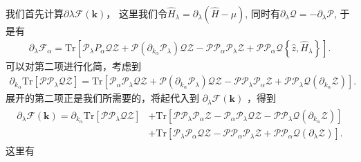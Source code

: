 \documentclass[10pt, oneside]{article}
\begin{document}
我们首先计算\(\partial \lambda \mathcal{F}  \left(\bm{k }\right)\)， 这里我们令\(\hat{H}_{\lambda} = \partial_{\lambda} \left(\hat{H} - \mu\right)\), 同时有\(\partial_{\lambda} \mathcal{Q} = - \partial_{\lambda} \mathcal{P}\), 于是有
\begin{align}
	\boxed{
		\partial_{\lambda} \mathcal{F}_{\alpha} = \mathrm{Tr} \left[\mathcal{P}_{\lambda} P_{\alpha} \mathcal{Q} \mathcal{Z} + \mathcal{P} \left(\partial_{k_{\alpha}} \mathcal{P}_{\lambda}\right) \mathcal{Q} \mathcal{Z} - \mathcal{P} \mathcal{P}_{\alpha} \mathcal{P}_{\lambda} \mathcal{Z} + \mathcal{P} \mathcal{P}_{\alpha} \mathcal{Q} \left\{\hat{z}, \hat{H}_{\lambda}\right\} \right].
	}
\end{align}
可以对第二项进行化简，考虑到
\begin{align}
	\partial_{k_{\alpha}} \mathrm{Tr} \left[\mathcal{P} \mathcal{P}_{\lambda} \mathcal{Q} \mathcal{Z} \right] = \mathrm{Tr} \left[\mathcal{P}_{\alpha} \mathcal{P}_{\lambda} \mathcal{Q} \mathcal{Z} + \mathcal{P} \left(\partial_{k_{\alpha}} \mathcal{P}_{\lambda}\right) \mathcal{Q} \mathcal{Z} - \mathcal{P} \mathcal{P}_{\lambda} \mathcal{P}_{\alpha} \mathcal{Z} + \mathcal{P} \mathcal{P}_{\lambda} \mathcal{Q} \left( \partial_{k_{\alpha}} \mathcal{Z}\right) \right].
\end{align}
展开的第二项正是我们所需要的，将起代入到 \(\partial_{\lambda} \mathcal{F} \left(\bm{k }\right)\) ，得到
\begin{align}
	\begin{split}
		\partial_{\lambda} \mathcal{F} \left(\bm{k }\right)  = \partial_{k_{\alpha}} \mathrm{Tr} \left[\mathcal{P} \mathcal{P}_{\lambda} \mathcal{Q} \mathcal{Z} \right] & + \mathrm{Tr} \left[\mathcal{P} \mathcal{P}_{\lambda} \mathcal{P}_{\alpha} \mathcal{Z}  - \mathcal{P}_{\alpha} \mathcal{P}_{\lambda} \mathcal{Q} \mathcal{Z} - \mathcal{P} \mathcal{P}_{\lambda} \mathcal{Q} \left( \partial_{k_{\alpha}} \mathcal{Z}\right) \right] \\
		& + \mathrm{Tr} \left[\mathcal{P}_{\lambda} \mathcal{P}_{\alpha} \mathcal{Q} \mathcal{Z} - \mathcal{P} \mathcal{P}_{\alpha} \mathcal{P}_{\lambda} \mathcal{Z} + \mathcal{P} \mathcal{P}_{\alpha} \mathcal{Q} \left(\partial_{\lambda} \mathcal{Z}\right)\right].
	\end{split}
\end{align}
这里有
\end{document}
